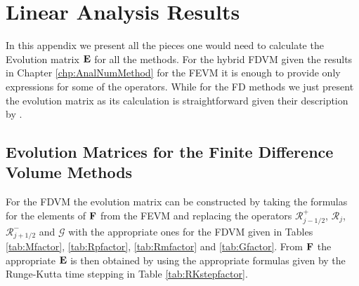 \chapter{Linear Analysis Results}
\label{app:LinAnal}
In this appendix we present all the pieces one would need to calculate the Evolution matrix $\mathbf{E}$ for all the methods. For the hybrid FDVM given the results in Chapter \ref{chp:AnalNumMethod} for the FEVM it is enough to provide only expressions for some of the operators. While for the FD methods we just present the evolution matrix as its calculation is straightforward given their description by \citet{Zoppou-etal-2017}.  

\section{Evolution Matrices for the Finite Difference Volume Methods}
For the FDVM the evolution matrix can be constructed by taking the formulas for the elements of $\mathbf{F}$ from the FEVM and replacing the operators $\mathcal{R}^+_{j-1/2}$, $\mathcal{R}_j$, $\mathcal{R}^-_{j+1/2}$ and $\mathcal{G}$ with the appropriate ones for the FDVM given in Tables \ref{tab:Mfactor}, \ref{tab:Rpfactor}, \ref{tab:Rmfactor} and \ref{tab:Gfactor}. From $\mathbf{F}$ the appropriate $\mathbf{E}$ is then obtained by using the appropriate formulas given by the Runge-Kutta time stepping in Table \ref{tab:RKstepfactor}. 



